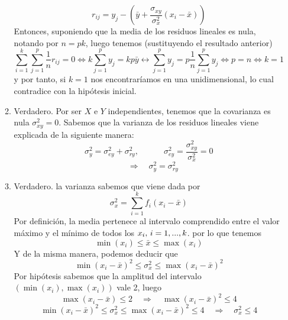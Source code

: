 \documentclass[fleqn]{article}
\def\next{\quad \Rightarrow \quad}
\begin{document}
\begin{enumerate}
\begin{enumerate}
                                                $$r_{ij} = y_j - \left( \bar{y} + \frac{\sigma_{xy}}{\sigma_x ^2} (x_i - \bar{x})\right)$$
                                                Entonces, suponiendo que la media de los residuos lineales es nula, notando por $n=pk$, luego tenemos 
                                                (sustituyendo el resultado anterior)
                                                $$\sum_{i=1}^k \sum_{j=1}^p \frac{1}{n}r_{ij} = 0 \Leftrightarrow k \sum_{j=1}^p y_j = kp \bar{y}
                                                \leftrightarrow \sum_{j=1}^p y_j = p \frac{1}{n} \sum_{j=1}^p y_j \Leftrightarrow p=n \Leftrightarrow k=1$$
                                                y por tanto, si $k=1$ nos encontraríamos en una unidimensional, lo cual contradice con la hipótesis inicial.\\
                                \item Verdadero. Por ser $ X $ e $Y$ independientes, tenemos que la covarianza es nula $\sigma_{xy}^2  = 0$. Sabemos que la varianza de los residuos 
                                                lineales viene explicada de la siguiente manera:
                                                $$\sigma_y^2 = \sigma_{ey}^2 + \sigma_{ry}^2, \quad \quad \quad \sigma_{ey}^2 = \frac{\sigma_{xy}^2}{\sigma_x^2} = 0$$
                                                $$\next \sigma_y^2 = \sigma_{ry}^2$$
                                \item Verdadero. la varianza sabemos que viene dada por 
                                                $$\sigma_x^2 = \sum_{i=1}^k f_i(x_i - \bar{x})$$
                                                Por definición, la media pertenece al intervalo comprendido entre el valor máximo y el mínimo de todos los $x_i, \thinspace i=1,...,k$.
                                                por lo que tenemos
                                                $$\min(x_i) \leq \bar{x} \leq \max(x_i)$$
                                                Y de la misma manera, podemos deducir que 
                                                $$\min(x_i - \bar{x})^2 \leq \sigma_x^2 \leq \max(x_i - \bar{x})^2$$
                                                Por hipótesis sabemos que la amplitud del intervalo $(\min(x_i), \max(x_i))$ vale 2, luego
                                                $$\max(x_i - \bar{x}) \leq 2 \next \max(x_i - \bar{x})^2 \leq 4$$
                                                $$\min(x_i - \bar{x})^2 \leq \sigma_x^2 \leq \max(x_i - \bar{x})^2 \leq 4 \next \sigma_x^2 \leq 4 $$\\

\end{enumerate}
\end{enumerate}
\end{document}
